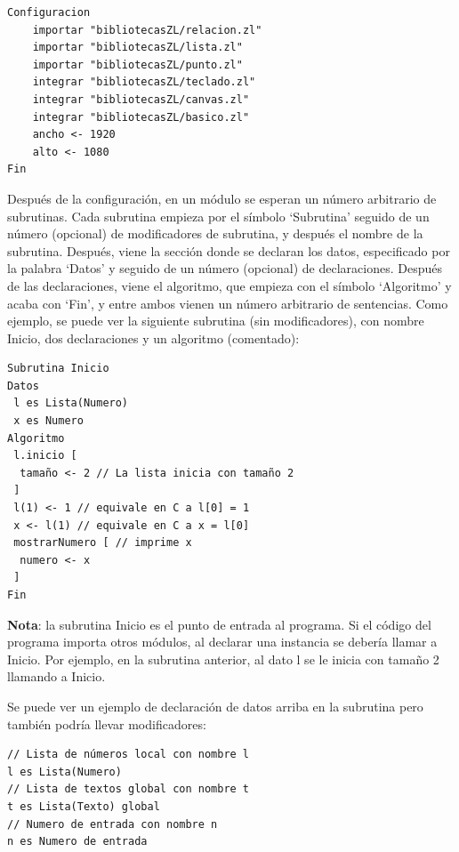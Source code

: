 \documentclass{report}
\begin{document}
	\begin{BVerbatim}
Configuracion
	importar "bibliotecasZL/relacion.zl"
	importar "bibliotecasZL/lista.zl"
	importar "bibliotecasZL/punto.zl"
	integrar "bibliotecasZL/teclado.zl"
	integrar "bibliotecasZL/canvas.zl"
	integrar "bibliotecasZL/basico.zl"
	ancho <- 1920
	alto <- 1080
Fin
	\end{BVerbatim}
	
	Después de la configuración, en un módulo se esperan un número arbitrario de subrutinas. Cada subrutina empieza por el símbolo `Subrutina' seguido de un número (opcional) de modificadores de subrutina, y después el nombre de la subrutina. Después, viene la sección donde se declaran los datos, especificado por la palabra `Datos' y seguido de un número (opcional) de declaraciones. Después de las declaraciones, viene el algoritmo, que empieza con el símbolo `Algoritmo' y acaba con `Fin', y entre ambos vienen un número arbitrario de sentencias. Como ejemplo, se puede ver la siguiente subrutina (sin modificadores), con nombre Inicio, dos declaraciones y un algoritmo (comentado):
	
	\begin{BVerbatim}
Subrutina Inicio
Datos
 l es Lista(Numero)
 x es Numero
Algoritmo
 l.inicio [ 
  tamaño <- 2 // La lista inicia con tamaño 2
 ]
 l(1) <- 1 // equivale en C a l[0] = 1
 x <- l(1) // equivale en C a x = l[0]
 mostrarNumero [ // imprime x
  numero <- x
 ]
Fin	
	\end{BVerbatim}
	
	\vspace{10px}
	\noindent
	\textbf{Nota}: la subrutina Inicio es el punto de entrada al programa. Si el código del programa importa otros módulos, al declarar una instancia se debería llamar a Inicio. Por ejemplo, en la subrutina anterior, al dato l se le inicia con tamaño 2 llamando a Inicio.
	
	\vspace{10px}
	
	Se puede ver un ejemplo de declaración de datos arriba en la subrutina pero también podría llevar modificadores:
	
	\begin{BVerbatim}
// Lista de números local con nombre l 
l es Lista(Numero)
// Lista de textos global con nombre t
t es Lista(Texto) global
// Numero de entrada con nombre n
n es Numero de entrada
	\end{BVerbatim}
	
	\vspace{10px}
	
\end{document}
